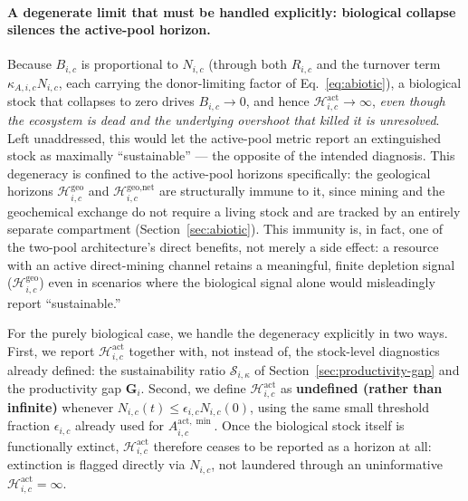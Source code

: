 \documentclass[twocolumn,10pt]{article}
\begin{document}
\paragraph{A degenerate limit that must be handled explicitly: biological collapse silences the active-pool horizon.} Because $B_{i,c}$ is proportional to $N_{i,c}$ (through both $R_{i,c}$ and the turnover term $\kappa_{A,i,c}N_{i,c}$, each carrying the donor-limiting factor of Eq.~\eqref{eq:abiotic}), a biological stock that collapses to zero drives $B_{i,c}\to0$, and hence $\mathcal{H}^{\text{act}}_{i,c}\to\infty$, \emph{even though the ecosystem is dead and the underlying overshoot that killed it is unresolved}. Left unaddressed, this would let the active-pool metric report an extinguished stock as maximally ``sustainable'' — the opposite of the intended diagnosis. This degeneracy is confined to the active-pool horizons specifically: the geological horizons $\mathcal H^{\text{geo}}_{i,c}$ and $\mathcal H^{\text{geo,net}}_{i,c}$ are structurally immune to it, since mining and the geochemical exchange do not require a living stock and are tracked by an entirely separate compartment (Section~\ref{sec:abiotic}). This immunity is, in fact, one of the two-pool architecture's direct benefits, not merely a side effect: a resource with an active direct-mining channel retains a meaningful, finite depletion signal ($\mathcal H^{\text{geo}}_{i,c}$) even in scenarios where the biological signal alone would misleadingly report ``sustainable.''

For the purely biological case, we handle the degeneracy explicitly in two ways. First, we report $\mathcal{H}^{\text{act}}_{i,c}$ together with, not instead of, the stock-level diagnostics already defined: the sustainability ratio $\mathcal{S}_{i,\kappa}$ of Section~\ref{sec:productivity-gap} and the productivity gap $\mathbf G_i$. Second, we define $\mathcal H^{\text{act}}_{i,c}$ as \textbf{undefined (rather than infinite)} whenever $N_{i,c}(t)\le\epsilon_{i,c}N_{i,c}(0)$, using the same small threshold fraction $\epsilon_{i,c}$ already used for $A^{\text{act},\min}_{i,c}$. Once the biological stock itself is functionally extinct, $\mathcal H^{\text{act}}_{i,c}$ therefore ceases to be reported as a horizon at all: extinction is flagged directly via $N_{i,c}$, not laundered through an uninformative $\mathcal H^{\text{act}}_{i,c}=\infty$.
\end{document}
